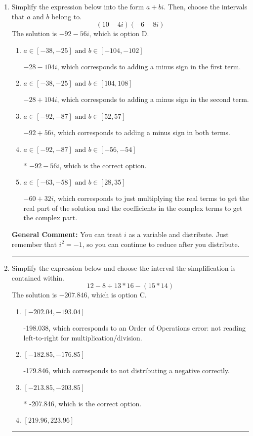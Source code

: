 \documentclass{extbook}[14pt]
\newcommand{\litem}[1]{\item #1

\rule{\textwidth}{0.4pt}}
\begin{document}
\begin{enumerate}\litem{
Simplify the expression below into the form $a+bi$. Then, choose the intervals that $a$ and $b$ belong to.
\[ (10 - 4 i)(-6 - 8 i) \]The solution is \( -92 - 56 i \), which is option D.\begin{enumerate}[label=\Alph*.]
\item \( a \in [-38, -25] \text{ and } b \in [-104, -102] \)

 $-28 - 104 i$, which corresponds to adding a minus sign in the first term.
\item \( a \in [-38, -25] \text{ and } b \in [104, 108] \)

 $-28 + 104 i$, which corresponds to adding a minus sign in the second term.
\item \( a \in [-92, -87] \text{ and } b \in [52, 57] \)

 $-92 + 56 i$, which corresponds to adding a minus sign in both terms.
\item \( a \in [-92, -87] \text{ and } b \in [-56, -54] \)

* $-92 - 56 i$, which is the correct option.
\item \( a \in [-63, -58] \text{ and } b \in [28, 35] \)

 $-60 + 32 i$, which corresponds to just multiplying the real terms to get the real part of the solution and the coefficients in the complex terms to get the complex part.
\end{enumerate}

\textbf{General Comment:} You can treat $i$ as a variable and distribute. Just remember that $i^2=-1$, so you can continue to reduce after you distribute.
}
\litem{
Simplify the expression below and choose the interval the simplification is contained within.
\[ 12 - 8 \div 13 * 16 - (15 * 14) \]The solution is \( -207.846 \), which is option C.\begin{enumerate}[label=\Alph*.]
\item \( [-202.04, -193.04] \)

 -198.038, which corresponds to an Order of Operations error: not reading left-to-right for multiplication/division.
\item \( [-182.85, -176.85] \)

 -179.846, which corresponds to not distributing a negative correctly.
\item \( [-213.85, -203.85] \)

* -207.846, which is the correct option.
\item \( [219.96, 223.96] \)


\end{enumerate}}
\end{enumerate}
\end{document}
